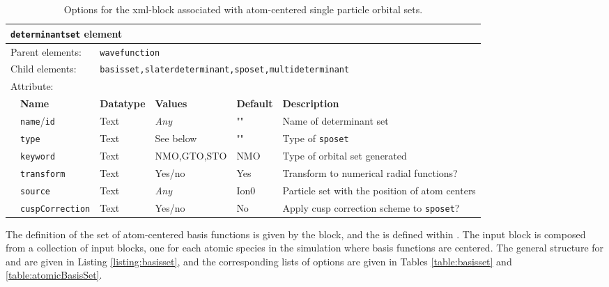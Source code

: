 \begin{table}[h]
\begin{center}
\begin{tabularx}{\textwidth}{l l l l l X }
\hline
\multicolumn{6}{l}{\texttt{determinantset} element} \\
\hline
\multicolumn{2}{l}{Parent elements:} & \multicolumn{4}{l}{\texttt{wavefunction}}\\
\multicolumn{2}{l}{Child  elements:} & \multicolumn{4}{l}{\texttt{basisset,slaterdeterminant,sposet,multideterminant}}\\
\multicolumn{2}{l}{Attribute:} & \multicolumn{4}{l}{}\\
   &   \bfseries Name              & \bfseries Datatype & \bfseries Values & \bfseries Default   & \bfseries Description \\
   &   \texttt{name}/\texttt{id}   &  Text              &  \textit{Any}    &  ""             & Name of determinant set \\
   &   \texttt{type}                    &  Text               &   See below   &   ""            &  Type of \texttt{sposet} \\
   &   \texttt{keyword}             &  Text               &   NMO,GTO,STO   &  NMO        & Type of orbital set generated \\  
   &   \texttt{transform}           &  Text               &   Yes/no          &  Yes         &  Transform to numerical radial functions?  \\
   &   \texttt{source}               &  Text               &   \textit{Any}    &  Ion0        & Particle set with the position of atom centers \\
   &   \texttt{cuspCorrection}  &  Text               &   Yes/no          &  No         & Apply cusp correction scheme to \texttt{sposet}? \\
  \hline
\end{tabularx}
\end{center}
\caption{Options for the  xml-block associated with atom-centered single particle orbital sets.}
\label{table:determinantset}
\end{table}

The definition of the set of atom-centered basis functions is given by the  block, and the  is defined within . The  input block is composed from a collection of  input blocks, one for each atomic species in the simulation where basis functions are centered. The general structure for  and  are given in Listing \ref{listing:basisset}, and the corresponding lists of options are given in Tables \ref{table:basisset} and \ref{table:atomicBasisSet}.

